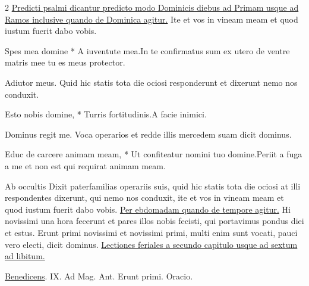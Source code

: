 \begin{multicols*}{2}
\ul{Predicti psalmi dicantur predicto modo Dominicis diebus ad Primam usque ad Ramos inclusive quando de Dominica agitur.}
 Ite et vos in vineam meam et quod iustum fuerit dabo vobis.
\begin{responsory-breve}
{Spes mea domine * A iuventute mea.}{In te confirmatus sum ex utero de ventre matris mee tu es meus protector.}
\end{responsory-breve}%
\newline \V Adiutor meus.
 Quid hic statis tota die ociosi responderunt et dixerunt nemo nos conduxit.
\begin{responsory-breve}
{Esto nobis domine, * Turris fortitudinis.}{A facie inimici.}
\end{responsory-breve}%
\newline \V Dominus regit me.
 Voca operarios et redde illis mercedem suam dicit dominus.
\begin{responsory-breve}
{Educ de carcere animam meam, * Ut confiteatur nomini tuo domine.}{Periit a fuga a me et non est qui requirat animam meam.}
\end{responsory-breve}%
\newline \V Ab occultis
 Dixit paterfamilias operariis suis, quid hic statis tota die ociosi at illi respondentes dixerunt, qui nemo nos conduxit, ite et vos in vineam meam et quod iustum fuerit dabo vobis.
\newline \ul{Per ebdomadam quando de tempore agitur.}
 Hi novissimi una hora fecerunt et pares illos nobis fecisti, qui portavimus pondus diei et estus.
 Erunt primi novissimi et novissimi primi, multi enim sunt vocati, pauci vero electi, dicit dominus.
\newline \ul{Lectiones feriales a secundo capitulo usque ad sextum ad libitum.}
{\color{Red} }
\par {} \R \hyperlink{benedicens-ergo}{Benedicens}. {\color{Red} IX. Ad Mag. Ant.} Erunt primi. {\color{Red} Oracio.} 

\end{multicols*}
